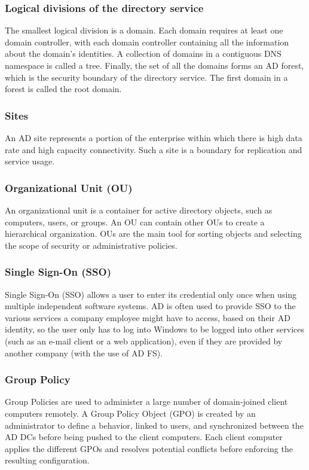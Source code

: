 \subsubsection{Logical divisions of the directory service}
The smallest logical division is a domain. Each domain requires at least one domain controller, with each domain controller containing all the information about the domain's identities. A collection of domains in a contiguous DNS namespace is called a tree. Finally, the set of all the domains forms an AD forest, which is the security boundary of the directory service. The first domain in a forest is called the root domain\cite[p. 9]{holme_self-paced_2011}.

\subsubsection{Sites}
An AD site represents a portion of the enterprise within which there is high data rate and high capacity connectivity. Such a site is a boundary for replication and service usage\cite[p. 11]{holme_self-paced_2011}.

\subsubsection{Organizational Unit (OU)}
An organizational unit is a container for active directory objects, such as computers, users, or groups. An OU can contain other OUs to create a hierarchical organization. OUs are the main tool for sorting objects and selecting the scope of security or administrative policies\cite[p. 11]{holme_self-paced_2011}.

\subsubsection{Single Sign-On (SSO)}
Single Sign-On (SSO) allows a user to enter its credential only once when using multiple independent software systems. AD is often used to provide SSO to the various services a company employee might have to access, based on their AD identity, so the user only has to log into Windows to be logged into other services (such as an e-mail client or a web application), even if they are provided by another company (with the use of AD FS).

\subsubsection{Group Policy}
Group Policies are used to administer a large number of domain-joined client computers remotely. A Group Policy Object (GPO) is created by an administrator to define a behavior, linked to users, and synchronized between the AD DCs before being pushed to the client computers. Each client computer applies the different GPOs and resolves potential conflicts before enforcing the resulting configuration.


